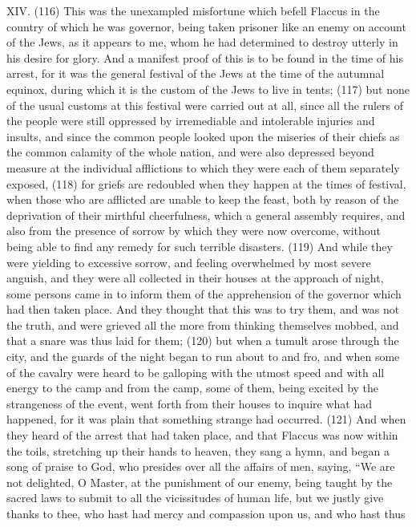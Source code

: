 XIV. (116) This was the unexampled misfortune which befell Flaccus in the country of which he was
governor, being taken prisoner like an enemy on account of the Jews, as it appears to me, whom
he had determined to destroy utterly in his desire for glory. And a manifest proof of this is to be
found in the time of his arrest, for it was the general festival of the Jews at the time of the autumnal
equinox, during which it is the custom of the Jews to live in tents; (117) but none of the usual
customs at this festival were carried out at all, since all the rulers of the people were still oppressed
by irremediable and intolerable injuries and insults, and since the common people looked upon the
miseries of their chiefs as the common calamity of the whole nation, and were also depressed
beyond measure at the individual afflictions to which they were each of them separately exposed,
(118) for griefs are redoubled when they happen at the times of festival, when those who are
afflicted are unable to keep the feast, both by reason of the deprivation of their mirthful
cheerfulness, which a general assembly requires, and also from the presence of sorrow by which
they were now overcome, without being able to find any remedy for such terrible disasters. (119)
And while they were yielding to excessive sorrow, and feeling overwhelmed by most severe
anguish, and they were all collected in their houses at the approach of night, some persons came
in to inform them of the apprehension of the governor which had then taken place. And they thought
that this was to try them, and was not the truth, and were grieved all the more from thinking
themselves mobbed, and that a snare was thus laid for them; (120) but when a tumult arose
through the city, and the guards of the night began to run about to and fro, and when some of the
cavalry were heard to be galloping with the utmost speed and with all energy to the camp and from
the camp, some of them, being excited by the strangeness of the event, went forth from their
houses to inquire what had happened, for it was plain that something strange had occurred. (121)
And when they heard of the arrest that had taken place, and that Flaccus was now within the toils,
stretching up their hands to heaven, they sang a hymn, and began a song of praise to God, who
presides over all the affairs of men, saying, ``We are not delighted, O Master, at the punishment of
our enemy, being taught by the sacred laws to submit to all the vicissitudes of human life, but we
justly give thanks to thee, who hast had mercy and compassion upon us, and who hast thus
